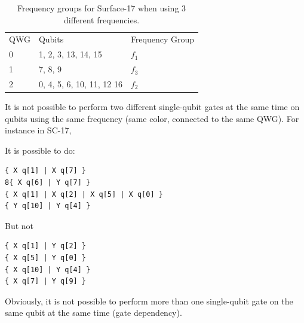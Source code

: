 \begin{table}[h!]

\caption{\label{T4}
Frequency groups for Surface-17 when using 3 different frequencies.}
\centering
\begin{tabular}{lll}
 & \\
\hline
QWG & Qubits & Frequency Group\\
\hline
\cellcolor{red!25}  0 & \cellcolor{red!25} 1, 2, 3, 13, 14, 15 & \cellcolor{red!25} $f_1$\\
\cellcolor{pink!25}  1 & \cellcolor{pink!25} 7, 8, 9 & \cellcolor{pink!25} $f_3$\\
\cellcolor{Aquamarine!25}  2 & \cellcolor{Aquamarine!25} 0, 4, 5, 6, 10, 11, 12 16 & \cellcolor{Aquamarine!25} $f_2$\\
\hline
\end{tabular}
\end{table}

\newpage
It is not possible to perform two different single-qubit gates at the same time on qubits using the same frequency (same color, connected to the same QWG). For instance in SC-17,

\begin{minipage}[t]{.45\textwidth}

It is possible to do:

\begin{verbatim}
{ X q[1] | X q[7] }
8{ X q[6] | Y q[7] }
{ X q[1] | X q[2] | X q[5] | X q[0] }
{ Y q[10] | Y q[4] }

\end{verbatim}

\end{minipage}
\hfill %
\begin{minipage}[t]{.45\textwidth}

But not

\begin{verbatim}
{ X q[1] | Y q[2] }
{ X q[5] | Y q[0] }
{ X q[10] | Y q[4] }
{ X q[7] | Y q[9] }
\end{verbatim}

\end{minipage}

Obviously, it is not possible to perform more than one single-qubit gate on the same qubit at the same time (gate dependency).

